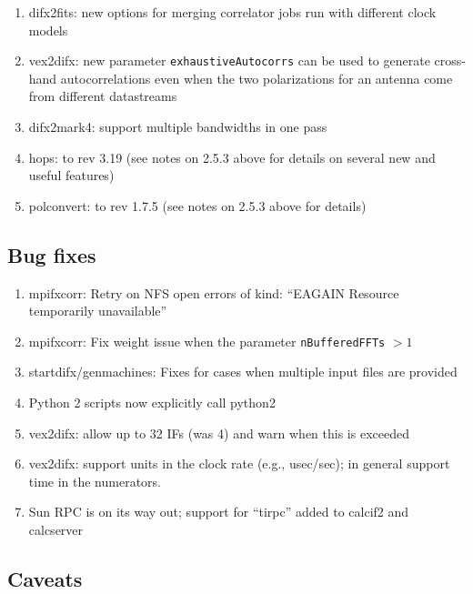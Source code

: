 \begin{enumerate}
\item difx2fits: new options for merging correlator jobs run with different clock models
\item vex2difx: new parameter {\tt exhaustiveAutocorrs} can be used to generate cross-hand autocorrelations even when the two polarizations for an antenna come from different datastreams
\item difx2mark4: support multiple bandwidths in one pass
\item hops: to rev 3.19 (see notes on 2.5.3 above for details on several new and useful features)
\item polconvert: to rev 1.7.5 (see notes on 2.5.3 above for details)
\end{enumerate}

\subsection{Bug fixes}

\begin{enumerate}
\item mpifxcorr: Retry on NFS open errors of kind: ``EAGAIN Resource temporarily unavailable''
\item mpifxcorr: Fix weight issue when the parameter {\tt nBufferedFFTs} $ > 1$
\item startdifx/genmachines: Fixes for cases when multiple input files are provided
\item Python 2 scripts now explicitly call python2
\item vex2difx: allow up to 32 IFs (was 4) and warn when this is exceeded
\item vex2difx: support units in the clock rate (e.g., usec/sec); in general support time in the numerators.
\item Sun RPC is on its way out; support for ``tirpc'' added to calcif2 and calcserver
\end{enumerate}

\subsection{Caveats}

